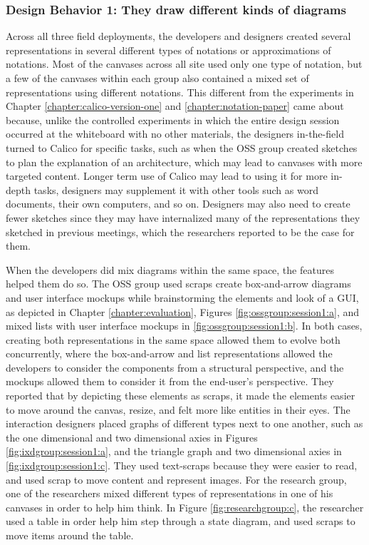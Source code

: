 \subsubsection{Design Behavior 1: They draw different kinds of diagrams}

Across all three field deployments, the developers and designers created several representations in several different types of notations or approximations of notations. Most of the canvases across all site used only one type of notation, but a few of the canvases within each group also contained a mixed set of representations using different notations. This different from the experiments in Chapter \ref{chapter:calico-version-one} and \ref{chapter:notation-paper} came about because, unlike the controlled experiments in which the entire design session occurred at the whiteboard with no other materials, the designers in-the-field turned to Calico for specific tasks, such as when the OSS group created sketches to plan the explanation of an architecture, which may lead to canvases with more targeted content. Longer term use of Calico may lead to using it for more in-depth tasks, designers may supplement it with other tools such as word documents, their own computers, and so on. Designers may also need to create fewer sketches since they may have internalized many of the representations they sketched in previous meetings, which the researchers reported to be the case for them.

When the developers did mix diagrams within the same space, the features helped them do so. The OSS group used scraps create box-and-arrow diagrams and user interface mockups while brainstorming the elements and look of a GUI, as depicted in Chapter \ref{chapter:evaluation}, Figures \ref{fig:ossgroup:session1:a}, and mixed lists with user interface mockups in \ref{fig:ossgroup:session1:b}. In both cases, creating both representations in the same space allowed them to evolve both concurrently, where the box-and-arrow and list representations allowed the developers to consider the components from a structural perspective, and the mockups allowed them to consider it from the end-user's perspective. They reported that by depicting these elements as scraps, it made the elements easier to move around the canvas, resize, and felt more like entities in their eyes. The interaction designers placed graphs of different types next to one another, such as the one dimensional and two dimensional axies in Figures \ref{fig:ixdgroup:session1:a}, and the triangle graph and two dimensional axies in \ref{fig:ixdgroup:session1:c}. They used text-scraps because they were easier to read, and used scrap to move content and represent images. For the research group, one of the researchers mixed different types of representations in one of his canvases in order to help him think. In Figure \ref{fig:researchgroup:c}, the researcher used a table in order help him step through a state diagram, and used scraps to move items around the table.

